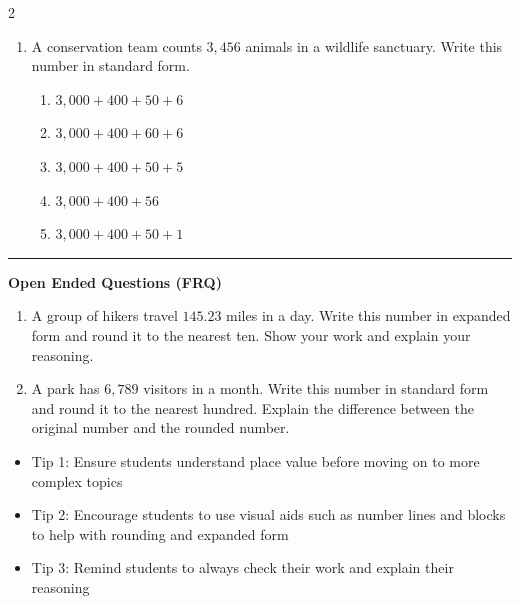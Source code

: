 \documentclass[10pt]{article}
\begin{document}
\begin{multicols}{2}
\begin{enumerate}[label=\textbf{Q\arabic*.}, leftmargin=*, itemsep=6pt, parsep=0pt]
  \item \small A conservation team counts $3,456$ animals in a wildlife sanctuary. Write this number in standard form.
  \begin{enumerate}[label=(\Alph*), leftmargin=0.6cm, nosep, itemsep=2pt]
    \item $3,000 + 400 + 50 + 6$
    \item $3,000 + 400 + 60 + 6$
    \item $3,000 + 400 + 50 + 5$
    \item $3,000 + 400 + 56$
    \item $3,000 + 400 + 50 + 1$
  \end{enumerate}

\end{enumerate}
\end{multicols}

\vspace{-0.2cm}
\hrule
\vspace{0.2cm}
\textbf{\small Open Ended Questions (FRQ)}
\begin{enumerate}[label=\textbf{Q\arabic*.}, start=9, itemsep=5pt, topsep=0pt]

  \item \small A group of hikers travel $145.23$ miles in a day. Write this number in expanded form and round it to the nearest ten. Show your work and explain your reasoning. \vspace{2cm}

  \item \small A park has $6,789$ visitors in a month. Write this number in standard form and round it to the nearest hundred. Explain the difference between the original number and the rounded number. \vspace{2cm}

\end{enumerate}

\vfill

\begin{tcolorbox}[colback=blue!5, colframe=mainblue!50, title=\small \textbf{Chef's Tips}, fonttitle=\bfseries, bottom=1mm]
\begin{itemize}[noitemsep, topsep=2pt, leftmargin=0.5cm]
  \item \scriptsize Tip 1: Ensure students understand place value before moving on to more complex topics\item \scriptsize Tip 2: Encourage students to use visual aids such as number lines and blocks to help with rounding and expanded form\item \scriptsize Tip 3: Remind students to always check their work and explain their reasoning
\end{itemize}
\end{tcolorbox}
\end{document}
